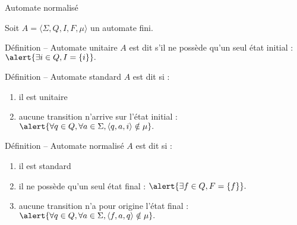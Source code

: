 
\begingroup

\begin{frame}{Automate normalisé}

  Soit $A = \langle \Sigma, Q, I, F, \mu\rangle$ un automate fini. 

  \begin{block}{Définition -- Automate unitaire}
    $A$ est dit  s'il ne possède qu'un seul état initial :
    $\alert{\exists i \in Q, I = \{i\}}.$
  \end{block}

  \begin{block}{Définition -- Automate standard}
    $A$ est dit  si :
    \begin{enumerate}
    \item il est \alert{unitaire}
    \item aucune transition n'arrive sur l'état initial :
    $\alert{\forall q\in Q, \forall a\in \Sigma, \langle q, a, i\rangle \notin \mu}.$
    \end{enumerate}
  \end{block}

  \begin{block}{Définition -- Automate normalisé}
    $A$ est dit  si :
    \begin{enumerate}
    \item il est \alert{standard}
    \item il ne possède qu'un seul état final : $\alert{\exists f \in Q, F = \{f\}}.$
    \item aucune transition n'a pour origine l'état final :
    $\alert{\forall q\in Q, \forall a\in \Sigma, \langle f, a, q\rangle \notin \mu}.$
    \end{enumerate}
  \end{block}
\end{frame}
\endgroup
